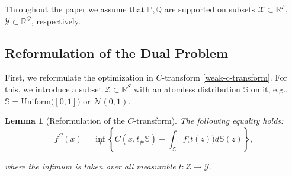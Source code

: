 \documentclass{article} %
\newtheorem{lemma}{Lemma}
\begin{document}
\vspace{-3mm}Throughout the paper we assume that $\mathbb{P},\mathbb{Q}$ are supported on subsets $\mathcal{X}\subset\mathbb{R}^{P}$, $\mathcal{Y}\subset\mathbb{R}^{Q}$, respectively.


\vspace{-1.5mm}\subsection{Reformulation of the Dual Problem}
\label{sec-derivation}

\vspace{-1.5mm}First, we reformulate the optimization in $C$-transform \eqref{weak-c-transform}. For this, we introduce a subset $\mathcal{Z}\subset\mathbb{R}^{S}$ with an atomless distribution $\mathbb{S}$ on it, e.g., $\mathbb{S}=\text{Uniform}
\big([0,1]\big)$ or $\mathcal{N}(0,1)$.

\begin{lemma}[Reformulation of the $C$-transform] The following equality holds:\vspace{-1.4mm}
\begin{equation}
    f^{C}(x)\!=\! \inf_{t}\!\left\lbrace C(x,t_{\#}\mathbb{S})\!-\!\int_{\mathcal{Z}}f\big(t(z)\big)d\mathbb{S}(z)\!\right\rbrace,
    \label{reform-c-lower-eq}
\end{equation}

\vspace{-2mm}where the infimum is taken over all measurable ${t:\mathcal{Z}\rightarrow\mathcal{Y}}$.
\label{lemma-t}
\end{lemma}
\end{document}
